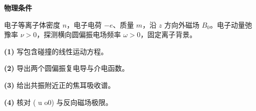 \textbf{物理条件}\par 电子等离子体密度 \(n\)，电子电荷 \(-e\)、质量 \(m\)，沿 \(z\) 方向外磁场 \(B_0\)。电子动量弛豫率 \(\nu>0\)，探测横向圆偏振电场频率 \(\omega>0\)，固定离子背景。
\par\noindent\textbf{(1)} 写包含碰撞的线性运动方程。
\par\noindent\textbf{(2)} 导出两个圆偏振复电导与介电函数。
\par\noindent\textbf{(3)} 给出共振附近正的焦耳吸收谱。
\par\noindent\textbf{(4)} 核对 (
u	o0) 与反向磁场极限。
